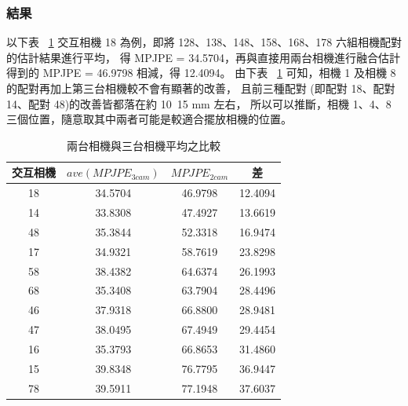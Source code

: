 \subsubsection{結果}
以下表 ~\ref{ch3_ave_3cam_vs_2cam} 交互相機 18 為例，即將 128、138、148、158、168、178 六組相機配對的估計結果進行平均，
得 MPJPE = 34.5704，再與直接用兩台相機進行融合估計得到的 MPJPE = 46.9798 相減，得 12.4094。
由下表 ~\ref{ch3_ave_3cam_vs_2cam} 可知，相機 1 及相機 8 的配對再加上第三台相機較不會有顯著的改善，
且前三種配對 (即配對 18、配對 14、配對 48)的改善皆都落在約 10~15 mm 左右，
所以可以推斷，相機 1、4、8 三個位置，隨意取其中兩者可能是較適合擺放相機的位置。
\begin{table}[!ht]
   \caption[兩台相機與三台相機平均之比較]{兩台相機與三台相機平均之比較}
   \centering
   \label{ch3_ave_3cam_vs_2cam}
   \setlength{\tabcolsep}{3pt}
   \renewcommand\arraystretch{1.5}
   \begin{tabular}{c|c|c|c}
      交互相機 & $ave(MPJPE_{3 cam})$ & $MPJPE_{2 cam}$ & 差 \\
      \midrule[2pt]
      18 & 34.5704 & 46.9798 & 12.4094 \\
      14 & 33.8308 & 47.4927 & 13.6619 \\
      48 & 35.3844 & 52.3318 & 16.9474 \\
      17 & 34.9321 & 58.7619 & 23.8298 \\ 
      58 & 38.4382 & 64.6374 & 26.1993 \\
      68 & 35.3408 & 63.7904 & 28.4496 \\
      46 & 37.9318 & 66.8800 & 28.9481 \\  
      47 & 38.0495 & 67.4949 & 29.4454 \\ 
      16 & 35.3793 & 66.8653 & 31.4860 \\ 
      15 & 39.8348 & 76.7795 & 36.9447 \\
      78 & 39.5911 & 77.1948 & 37.6037 \\
   \end{tabular}
\end{table}

